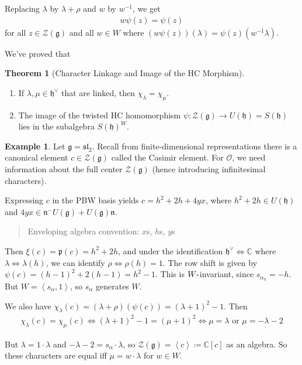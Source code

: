 \documentclass[11pt]{scrartcl}
\theoremstyle{definition}
\theoremstyle{theorem}
\newtheorem{theorem}{Theorem}[section]
\theoremstyle{proof}
\theoremstyle{definition}
\theoremstyle{break}
\newtheorem{example}{Example}[section]
\theoremstyle{problem}
\newcommand{\CC}[0]{{\mathbb{C}}}
\newcommand{\dash}[0]{{\hbox{-}}}
\newcommand{\definedas}[0]{\coloneqq}
\newcommand{\dual}[0]{^\vee}
\newcommand{\generators}[1]{\left\langle{#1}\right\rangle}
\newcommand{\inv}[0]{^{-1}}
\newcommand{\lieg}[0]{{\mathfrak{g}}}
\newcommand{\lieh}[0]{{\mathfrak{h}}}
\newcommand{\lien}[0]{{\mathfrak{n}}}
\newcommand{\liesl}[0]{{\mathfrak{sl}}}
\newcommand{\pr}[0]{{\mathfrak{p}}}
\newcommand{\OO}[0]{{\mathcal{O}}}
\newcommand{\mcz}[0]{{\mathcal{Z}}}
\renewcommand{\to}[0]{\longrightarrow}
\begin{document}
Replacing \(\lambda\) by \(\lambda + \rho\) and \(w\) by \(w\inv\), we
get
\begin{align*}
w\psi(z) = \psi(z)
\end{align*} for all \(z\in \mcz(\lieg)\) and all \(w\in W\) where
\((w\psi(z))(\lambda) = \psi(z)(w\inv \lambda)\).

We've proved that

\begin{theorem}[Character Linkage and Image of the HC Morphism]

\hfill

\begin{enumerate}
\def\labelenumi{\alph{enumi}.}
\item
  If \(\lambda, \mu \in \lieh\dual\) that are linked, then
  \(\chi_\lambda = \chi_\mu\).
\item
  The image of the twisted HC homomorphism
  \(\psi: \mcz(\lieg) \to U(\lieh) = S(\lieh)\) lies in the subalgebra
  \(S(\lieh)^W\).
\end{enumerate}

\end{theorem}

\begin{example}

Let \(\lieg = \liesl_2\). Recall from finite-dimensional representations
there is a canonical element \(c\in \mcz(\lieg)\) called the Casimir
element. For \(\OO\), we need information about the full center
\(\mcz(\lieg)\) (hence introducing infinitesimal characters).

Expressing \(c\) in the PBW basis yields \(c = h^2 + 2h + 4yx\), where
\(h^2 + 2h \in U(\lieh)\) and
\(4yx \in \lien^- U(\lieg) + U(\lieg) \lien\).

\begin{quote}
Enveloping algebra convention: \(x\)s, \(h\)s, \(y\)s
\end{quote}

Then \(\xi(c) = \pr(c) = h^2 + 2h\), and under the identification
\(\lieh\dual \iff \CC\) where \(\lambda \iff \lambda(h)\), we can
identify \(\rho \iff \rho(h) = 1\). The row shift is given by
\(\psi(c) = (h-1)^2 + 2(h-1) = h^2 - 1\). This is \(W\dash\)invariant,
since \(s_{\alpha_h} = -h\). But \(W = \generators{s_\alpha, 1}\), so
\(s_\alpha\) generates \(W\).

We also have
\(\chi_\lambda(c) = (\lambda + \rho) (\psi(c)) = (\lambda+1)^2 - 1\).
Then
\begin{align*}
\chi_\lambda(c) = \chi_\mu(c) \iff (\lambda+1)^2 - 1 = (\mu + 1)^2 \iff \mu = \lambda \text{ or } \mu = -\lambda - 2
\end{align*}

But \(\lambda = 1 \cdot \lambda\) and
\(-\lambda - 2 = s_\alpha \cdot \lambda\), so
\(\mcz(\lieg) = \generators{c} \definedas \CC[c]\) as an algebra. So
these characters are equal iff \(\mu = w\cdot \lambda\) for
\(w\in W\).\end{example}
\end{document}
